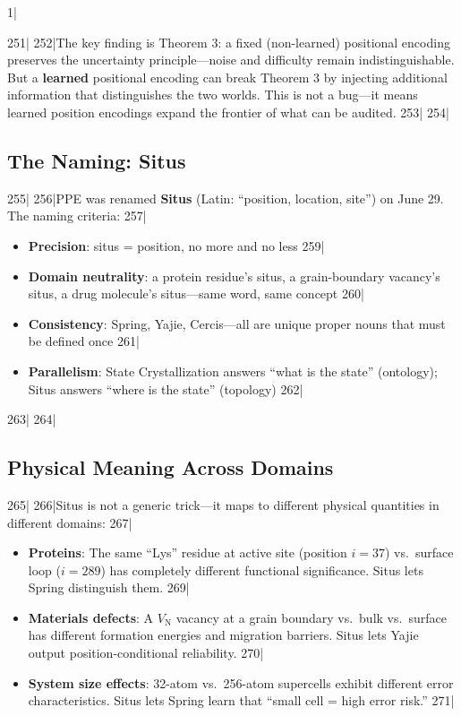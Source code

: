 1|\documentclass[12pt,a4paper]{article}
\begin{document}
251|
252|The key finding is Theorem 3: a fixed (non-learned) positional encoding preserves the uncertainty principle—noise and difficulty remain indistinguishable. But a \textbf{learned} positional encoding can break Theorem 3 by injecting additional information that distinguishes the two worlds. This is not a bug—it means learned position encodings expand the frontier of what can be audited.
253|
254|\subsection{The Naming: Situs}
255|
256|PPE was renamed \textbf{Situs} (Latin: ``position, location, site'') on June 29. The naming criteria:
257|\begin{itemize}
258|\item \textbf{Precision}: situs = position, no more and no less
259|\item \textbf{Domain neutrality}: a protein residue's situs, a grain-boundary vacancy's situs, a drug molecule's situs—same word, same concept
260|\item \textbf{Consistency}: Spring, Yajie, Cercis---all are unique proper nouns that must be defined once
261|\item \textbf{Parallelism}: State Crystallization answers ``what is the state'' (ontology); Situs answers ``where is the state'' (topology)
262|\end{itemize}
263|
264|\subsection{Physical Meaning Across Domains}
265|
266|Situs is not a generic trick—it maps to different physical quantities in different domains:
267|\begin{itemize}
268|\item \textbf{Proteins}: The same ``Lys'' residue at active site (position $i=37$) vs.\ surface loop ($i=289$) has completely different functional significance. Situs lets Spring distinguish them.
269|\item \textbf{Materials defects}: A $V_{\text{N}}$ vacancy at a grain boundary vs.\ bulk vs.\ surface has different formation energies and migration barriers. Situs lets Yajie output position-conditional reliability.
270|\item \textbf{System size effects}: 32-atom vs.\ 256-atom supercells exhibit different error characteristics. Situs lets Spring learn that ``small cell = high error risk.''
271|\end{itemize}
\end{document}

